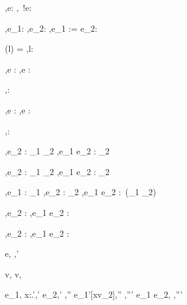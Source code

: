   {\Gamma,\Sigma \infers e:\Reference \beta}
  {\Gamma,\Sigma\infers\ !e:\beta}

  {\Gamma,\Sigma\infers e_1:\Reference \beta \Quad
   \Gamma,\Sigma\infers e_2:\beta}
  {\Gamma,\Sigma\infers e_1 := e_2:\Unit}

  {\Sigma(l) = \beta}
  {\Gamma,\Sigma\infers l:\Reference \beta}


  {\Gamma,\Sigma \infers e : \tau}
  {\Gamma,\Sigma \infers \Edit e : \Task \tau}

  {}
  {\Gamma,\Sigma \infers \Enter \tau : \Task \tau}

  {\Gamma,\Sigma \infers e : \Reference \beta}
  {\Gamma,\Sigma \infers \Update e : \Task \beta}


  {}
  {\Gamma,\Sigma \infers \Fail : \Task \tau}


  {
   {\Gamma,\Sigma \infers e_2 : \tau_1 \to \Task \tau_2}}
  {\Gamma,\Sigma \infers e_1 \Then e_2 : \Task \tau_2}


  {
   {\Gamma,\Sigma \infers e_2 : \tau_1 \to \Task \tau_2}}
  {\Gamma,\Sigma \infers e_1 \Next e_2 : \Task \tau_2}


  {\Gamma,\Sigma \infers e_1 : \Task \tau_1 \Quad
   \Gamma,\Sigma \infers e_2 : \Task \tau_2}
  {\Gamma,\Sigma \infers e_1 \And e_2 : \Task\,(\tau_1 \times \tau_2)}


  {
   {\Gamma,\Sigma \infers e_2 : \Task \tau}}
  {\Gamma,\Sigma \infers e_1 \Or e_2 : \Task \tau}


  {
   {\Gamma,\Sigma \infers e_2 : \Task \tau}}
  {\Gamma,\Sigma \infers e_1 \Xor e_2 : \Task \tau}



  {e,\hat{\sigma} \hat{\eval} ,\hat{\sigma}'}


  {}
  {v,\hat{\sigma}\hat{\eval} v,\hat{\sigma}}


  {e_1,\hat{\sigma}\hat{\eval} \lambda x:\tau.',\hat{\sigma}'\Quad
   e_2,\hat{\sigma}'\hat{\eval} ,\hat{\sigma}''\Quad
   e_1'[x\mapsto v_2],\hat{\sigma}''\hat{\eval} ,\hat{\sigma}'''}
  {e_1 e_2,\hat{\sigma} \hat{\eval} ,\hat{\sigma}'''}


